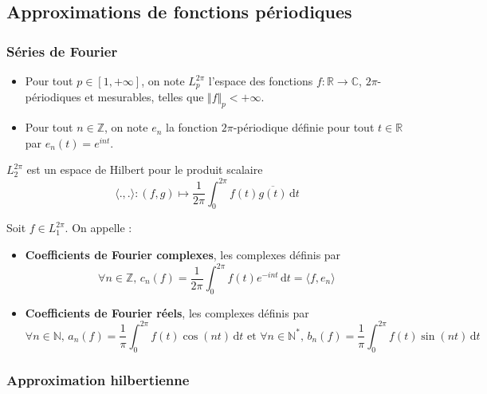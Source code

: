   \subsection{Approximations de fonctions périodiques}

  \subsubsection{Séries de Fourier}


  \begin{notation}
    \begin{itemize}
      \item Pour tout $p \in [1, +\infty]$, on note $L_p^{2\pi}$ l'espace des fonctions $f : \mathbb{R} \rightarrow \mathbb{C}$, $2\pi$-périodiques et mesurables, telles que $\Vert f \Vert_p < +\infty$.
      \item Pour tout $n \in \mathbb{Z}$, on note $e_n$ la fonction $2\pi$-périodique définie pour tout $t \in \mathbb{R}$ par $e_n(t) = e^{int}$.
    \end{itemize}
  \end{notation}

  \begin{proposition}
    $L_2^{2\pi}$ est un espace de Hilbert pour le produit scalaire
    \[ \langle ., . \rangle : (f, g) \mapsto \frac{1}{2 \pi} \int_0^{2\pi} f(t) \overline{g(t)} \, \mathrm{d}t \]
  \end{proposition}


  \begin{definition}
    Soit $f \in L_1^{2\pi}$. On appelle :
    \begin{itemize}
      \item \textbf{Coefficients de Fourier complexes}, les complexes définis par
      \[ \forall n \in \mathbb{Z}, \, c_n(f) = \frac{1}{2 \pi} \int_0^{2\pi} f(t) e^{-int} \, \mathrm{d}t = \langle f, e_n \rangle \]
      \item \textbf{Coefficients de Fourier réels}, les complexes définis par
      \[ \forall n \in \mathbb{N}, \, a_n(f) = \frac{1}{\pi} \int_0^{2\pi} f(t) \cos(nt) \, \mathrm{d}t \text{ et } \forall n \in \mathbb{N}^*, \, b_n(f) = \frac{1}{\pi} \int_0^{2\pi} f(t) \sin(nt) \, \mathrm{d}t \]
    \end{itemize}
  \end{definition}

  \subsubsection{Approximation hilbertienne}

